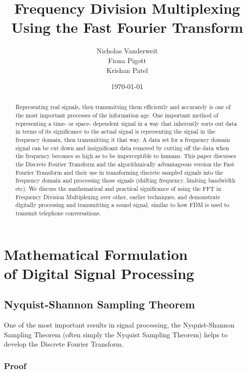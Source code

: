 \documentclass[12pt]{article}
\title{Frequency Division Multiplexing \\Using the Fast Fourier Transform }
\author{Nicholas Vanderweit \\Fiona Pigott \\Krishan Patel}
\date{\today}
\begin{document}
\maketitle


\begin{abstract}

Representing real signals, then transmitting them efficiently and accurately is 
one of the most important processes of the information age. One important 
method of representing a time- or space- dependent signal in a way that 
inherently sorts out data in terms of its significance to the actual signal is 
representing the signal in the frequency domain, then transmitting it that way. 
A data set for a frequency domain signal can be cut down and insignificant data 
removed by cutting off the data when the frequency becomes so high as to be 
imperceptible to humans.
This paper discusses the Discrete Fourier Transform and the algorithmically 
advantageous version the Fast Fourier Transform and their use in transforming 
discrete sampled signals into the frequency domain and processing those signals 
(shifting frequency, limiting bandwidth etc). We discuss the mathematical and 
practical significance of using the FFT in Frequency Division Multiplexing over 
other, earlier techniques, and demonstrate digitally processing and 
transmitting a sound signal, similar to how FDM is used to transmit telephone 
conversations.

\end{abstract}

\clearpage

\section{Mathematical Formulation \\of Digital Signal Processing}

\subsection{Nyquist-Shannon Sampling Theorem}

One of the most important results in signal processing, the Nyquist-Shannon 
Sampling Theorem (often simply the Nyquist Sampling Theorem) helps to develop 
the Discrete Fourier Transform.

\subsubsection{Proof}
\end{document}
